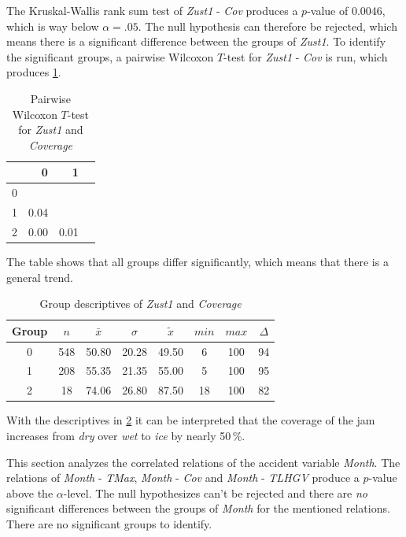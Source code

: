 The Kruskal-Wallis rank sum test of \textit{Zust1} - \textit{Cov} produces a $p$-value of 0.0046, which is way below $\alpha=.05$. The null hypothesis can therefore be rejected, which means there is a significant difference between the groups of \textit{Zust1}. To identify the significant groups, a pairwise Wilcoxon $T$-test for \textit{Zust1} - \textit{Cov} is run, which produces \cref{tbl:wilcoxon_baysis_initiator_Zust1_Cov}. 
\begin{table}[ht!]
	\tiny
	\centering
    \begin{tabular}{rrrr}
        \toprule
          & 0 & 1 \\ 
        \midrule
        0 &      & \\ 
        1 & 0.04 & \\ 
        2 & 0.00 & 0.01 \\ 
        \bottomrule
      \end{tabular}
    \caption{Pairwise Wilcoxon $T$-test for \textit{Zust1} and \textit{Coverage}}
    \label{tbl:wilcoxon_baysis_initiator_Zust1_Cov}
\end{table}
The table shows that all groups differ significantly, which means that there is a general trend.
\begin{table}[ht!]
	\tiny
	\centering
    \begin{tabular}{c|c|c|c|c|c|c|c}
        \toprule
        Group & $n$ & $\bar{x}$ & $\sigma$ & $\tilde{x}$ & $min$ & $max$ & $\Delta$ \\
        \midrule
        0 & 548 & 50.80 & 20.28 & 49.50 & 6  & 100 & 94 \\ 
        1 & 208 & 55.35 & 21.35 & 55.00 & 5  & 100 & 95 \\ 
        2 & 18  & 74.06 & 26.80 & 87.50 & 18 & 100 & 82 \\ 
        \bottomrule
      \end{tabular}
    \caption{Group descriptives of \textit{Zust1} and \textit{Coverage}}
    \label{tbl:descriptives_baysis_initiator_Zust1_Cov}
\end{table}
With the descriptives in \cref*{tbl:descriptives_baysis_initiator_Zust1_Cov} it can be interpreted that the coverage of the jam increases from \textit{dry} over \textit{wet} to \textit{ice} by nearly 50\,\%.

This section analyzes the correlated relations of the accident variable \textit{Month}. The relations of \textit{Month} - \textit{TMax}, \textit{Month} - \textit{Cov} and \textit{Month} - \textit{TLHGV} produce a $p$-value above the $\alpha$-level. The null hypothesizes can't be rejected and there are \textit{no} significant differences between the groups of \textit{Month} for the mentioned relations. There are no significant groups to identify.